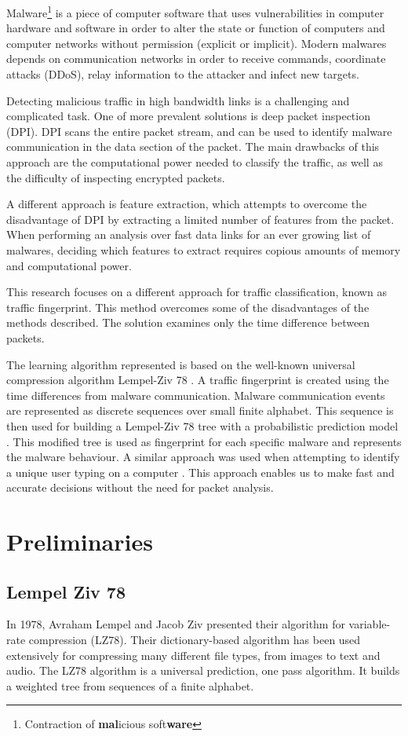 \documentclass[13pt,journal,compsoc,onecolumn]{IEEEtran}
\begin{document}
Malware\footnote{Contraction of \textbf{mal}icious soft\textbf{ware}} is a piece of computer software that uses vulnerabilities in computer hardware and software in order to alter the state or function of computers and computer networks without permission (explicit or implicit). Modern malwares depends on communication networks in order to receive commands, coordinate attacks (DDoS), relay information to the attacker and infect new targets.

Detecting malicious traffic in high bandwidth links is a challenging and complicated task. One of more prevalent solutions is deep packet inspection (DPI). DPI scans the entire packet stream, and can be used to identify malware communication in the data section of the packet. The main drawbacks of this approach are the computational power needed to classify the traffic, as well as the difficulty of inspecting encrypted packets. 

A different approach is feature extraction, which attempts to overcome the disadvantage of DPI by extracting a limited number of features from the packet. When performing an analysis over fast data links for an ever growing list of malwares, deciding which features to extract requires copious amounts of memory and computational power.

This research focuses on a different approach for traffic classification, known as traffic fingerprint. This method overcomes some of the disadvantages of the methods described. The solution examines only the time difference between packets.

The learning algorithm represented is based on the well-known universal compression algorithm Lempel-Ziv 78 \cite{Lem78}. A traffic fingerprint is created using the time differences from malware communication. Malware communication events are represented as discrete sequences over small finite alphabet. This sequence is then used for building a Lempel-Ziv 78 tree with a probabilistic prediction model \cite{MFe92}. This modified tree is used as fingerprint for each specific malware and represents the malware behaviour. A similar approach was used when attempting to identify a unique user typing on a computer \cite{Nis03}.
This approach enables us to make fast and accurate decisions without the need for packet analysis.

\section{Preliminaries}
\subsection{Lempel Ziv 78}
In 1978, Avraham Lempel and Jacob Ziv presented their algorithm for variable-rate compression \cite{Lem78} (LZ78). Their dictionary-based algorithm has been used extensively for compressing many different file types, from images to text and audio.
The LZ78 algorithm is a universal prediction, one pass algorithm. It builds a weighted tree from sequences of a finite alphabet.
\end{document}

